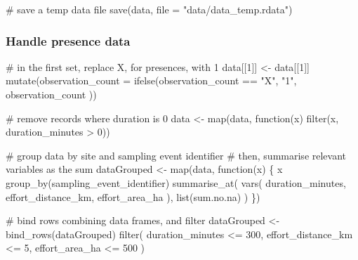 \documentclass[]{article}
\newenvironment{Shaded}{}{}
\newcommand{\CommentTok}[1]{\textcolor[rgb]{0.00,0.50,0.00}{#1}}
\newcommand{\ControlFlowTok}[1]{\textcolor[rgb]{0.00,0.00,1.00}{#1}}
\newcommand{\DataTypeTok}[1]{#1}
\newcommand{\DecValTok}[1]{#1}
\newcommand{\KeywordTok}[1]{\textcolor[rgb]{0.00,0.00,1.00}{#1}}
\newcommand{\NormalTok}[1]{#1}
\newcommand{\OperatorTok}[1]{#1}
\newcommand{\StringTok}[1]{\textcolor[rgb]{0.00,0.50,0.50}{#1}}
\begin{document}
\begin{Shaded}
\begin{Highlighting}[]
\CommentTok{# save a temp data file}
\KeywordTok{save}\NormalTok{(data, }\DataTypeTok{file =} \StringTok{"data/data_temp.rdata"}\NormalTok{)}
\end{Highlighting}
\end{Shaded}

\hypertarget{handle-presence-data}{%
\subsubsection{Handle presence data}\label{handle-presence-data}}

\begin{Shaded}
\begin{Highlighting}[]

\CommentTok{# in the first set, replace X, for presences, with 1}
\NormalTok{data[[}\DecValTok{1}\NormalTok{]] <-}\StringTok{ }\NormalTok{data[[}\DecValTok{1}\NormalTok{]] }\OperatorTok{%
\StringTok{  }\KeywordTok{mutate}\NormalTok{(}\DataTypeTok{observation_count =} \KeywordTok{ifelse}\NormalTok{(observation_count }\OperatorTok{==}\StringTok{ "X"}\NormalTok{,}
    \StringTok{"1"}\NormalTok{, observation_count}
\NormalTok{  ))}

\CommentTok{# remove records where duration is 0}
\NormalTok{data <-}\StringTok{ }\KeywordTok{map}\NormalTok{(data, }\ControlFlowTok{function}\NormalTok{(x) }\KeywordTok{filter}\NormalTok{(x, duration_minutes }\OperatorTok{>}\StringTok{ }\DecValTok{0}\NormalTok{))}

\CommentTok{# group data by site and sampling event identifier}
\CommentTok{# then, summarise relevant variables as the sum}
\NormalTok{dataGrouped <-}\StringTok{ }\KeywordTok{map}\NormalTok{(data, }\ControlFlowTok{function}\NormalTok{(x) \{}
\NormalTok{  x }\OperatorTok{%
\StringTok{    }\KeywordTok{group_by}\NormalTok{(sampling_event_identifier) }\OperatorTok{%
\StringTok{    }\KeywordTok{summarise_at}\NormalTok{(}
      \KeywordTok{vars}\NormalTok{(}
\NormalTok{        duration_minutes, effort_distance_km,}
\NormalTok{        effort_area_ha}
\NormalTok{      ),}
      \KeywordTok{list}\NormalTok{(sum.no.na)}
\NormalTok{    )}
\NormalTok{\})}

\CommentTok{# bind rows combining data frames, and filter}
\NormalTok{dataGrouped <-}\StringTok{ }\KeywordTok{bind_rows}\NormalTok{(dataGrouped) }\OperatorTok{%
\StringTok{  }\KeywordTok{filter}\NormalTok{(}
\NormalTok{    duration_minutes }\OperatorTok{<=}\StringTok{ }\DecValTok{300}\NormalTok{,}
\NormalTok{    effort_distance_km }\OperatorTok{<=}\StringTok{ }\DecValTok{5}\NormalTok{,}
\NormalTok{    effort_area_ha }\OperatorTok{<=}\StringTok{ }\DecValTok{500}
\NormalTok{  )}

}}}}
\end{Highlighting}
\end{Shaded}
\end{document}
